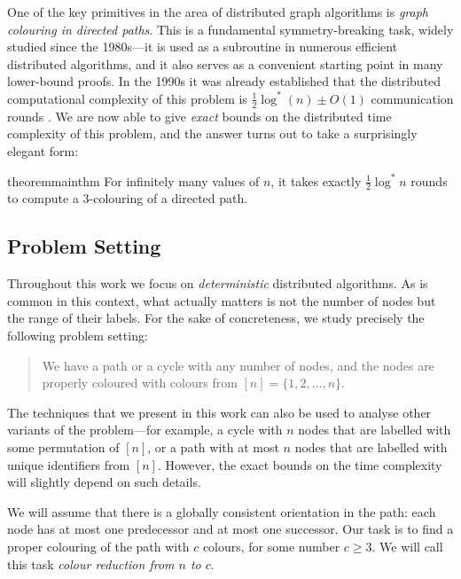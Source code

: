 \documentclass[a4paper,11pt]{article}
\theoremstyle{remark}
\newcommand{\logst}{\log^{*}}
\begin{document}
One of the key primitives in the area of distributed graph algorithms is \emph{graph colouring in directed paths}. This is a fundamental symmetry-breaking task, widely studied since the 1980s---it is used as a subroutine in numerous efficient distributed algorithms, and it also serves as a convenient starting point in many lower-bound proofs. In the 1990s it was already established that the distributed computational complexity of this problem is $\frac{1}{2} \logst(n) \pm O(1)$ communication rounds \cite{cole86deterministic,linial92locality}. We are now able to give \emph{exact} bounds on the distributed time complexity of this problem, and the answer turns out to take a surprisingly elegant form:

\begin{restatable}{theorem}{mainthm}\label{thm:main}
    For infinitely many values of $n$, it takes exactly $\frac{1}{2}\logst n$ rounds to compute a $3$-colouring of a directed path.
\end{restatable}


\subsection{Problem Setting}

Throughout this work we focus on \emph{deterministic} distributed algorithms. As is common in this context, what actually matters is not the number of nodes but the range of their labels. For the sake of concreteness, we study precisely the following problem setting:
\begin{quote}
    We have a path or a cycle with any number of nodes, and the nodes are properly coloured with colours from $[n] = \{1,2,\dotsc,n\}$.
\end{quote}
The techniques that we present in this work can also be used to analyse other variants of the problem---for example, a cycle with $n$ nodes that are labelled with some permutation of $[n]$, or a path with at most $n$ nodes that are labelled with unique identifiers from $[n]$. However, the exact bounds on the time complexity will slightly depend on such details.

We will assume that there is a globally consistent orientation in the path: each node has at most one predecessor and at most one successor. Our task is to find a proper colouring of the path with $c$ colours, for some number $c \ge 3$. We will call this task \emph{colour reduction from $n$ to $c$}.
\end{document}
